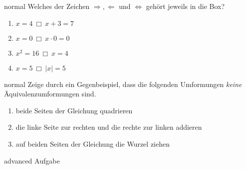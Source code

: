 \documentclass[../lineare_gleichungen.tex]{subfiles}
\begin{document}
    \begin{exercise}{normal}
        Welches der Zeichen $\Rightarrow, \Leftarrow$ und $\Leftrightarrow$ gehört jeweils in die Box?
        \begin{multicols}{2}
            \begin{enumerate}
                \item $x=4 ~\Box~ x+3=7$
                \item $x=0 ~\Box~ x\cdot 0=0$
                \item $x^2=16 ~\Box~ x=4$
                \item $x=5 ~\Box~ |x|=5$
            \end{enumerate}
        \end{multicols}
    \end{exercise}
    \begin{exercise}{normal}
        Zeige durch ein Gegenbeispiel, dass die folgenden Umformungen \emph{keine} Äquivalenzumformungen sind.
        \begin{enumerate}
            \item beide Seiten der Gleichung quadrieren
            \item die linke Seite zur rechten und die rechte zur linken addieren
            \item auf beiden Seiten der Gleichung die Wurzel ziehen
        \end{enumerate}
    \end{exercise}
    \begin{exercise}{advanced}
        Aufgabe
    \end{exercise}
\end{document}
